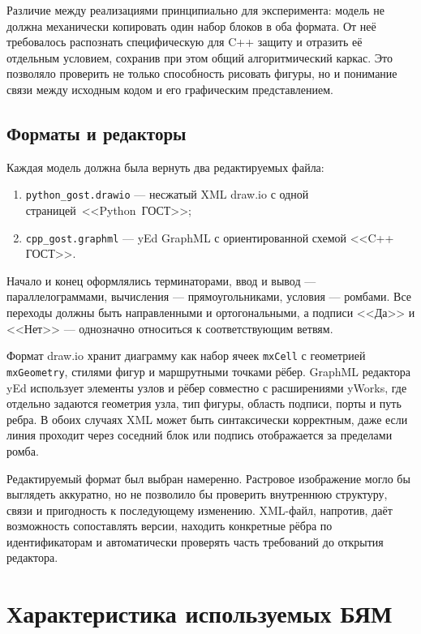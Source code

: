 \documentclass[a4paper,12pt]{extreport}
\newcommand{\code}[1]{\texttt{#1}}
\begin{document}
Различие между реализациями принципиально для эксперимента: модель не должна механически копировать один набор блоков в оба формата. От неё требовалось распознать специфическую для C++ защиту и отразить её отдельным условием, сохранив при этом общий алгоритмический каркас. Это позволяло проверить не только способность рисовать фигуры, но и понимание связи между исходным кодом и его графическим представлением.

\subsection{Форматы и редакторы}

Каждая модель должна была вернуть два редактируемых файла:

\begin{enumerate}[label=\arabic*)]
  \item \code{python\_gost.drawio} --- несжатый XML draw.io с одной страницей~<<Python~ГОСТ>>;
  \item \code{cpp\_gost.graphml} --- yEd GraphML с ориентированной схемой <<C++ ГОСТ>>.
\end{enumerate}

Начало и конец оформлялись терминаторами, ввод и вывод --- параллелограммами, вычисления --- прямоугольниками, условия --- ромбами. Все переходы должны быть направленными и ортогональными, а подписи <<Да>> и <<Нет>> --- однозначно относиться к соответствующим ветвям.

Формат draw.io хранит диаграмму как набор ячеек \code{mxCell} с геометрией \code{mxGeometry}, стилями фигур и маршрутными точками рёбер. GraphML редактора yEd использует элементы узлов и рёбер совместно с расширениями yWorks, где отдельно задаются геометрия узла, тип фигуры, область подписи, порты и путь ребра. В обоих случаях XML может быть синтаксически корректным, даже если линия проходит через соседний блок или подпись отображается за пределами ромба.

Редактируемый формат был выбран намеренно. Растровое изображение могло бы выглядеть аккуратно, но не позволило бы проверить внутреннюю структуру, связи и пригодность к последующему изменению. XML-файл, напротив, даёт возможность сопоставлять версии, находить конкретные рёбра по идентификаторам и автоматически проверять часть требований до открытия редактора.

\section{Характеристика используемых БЯМ}
\end{document}
